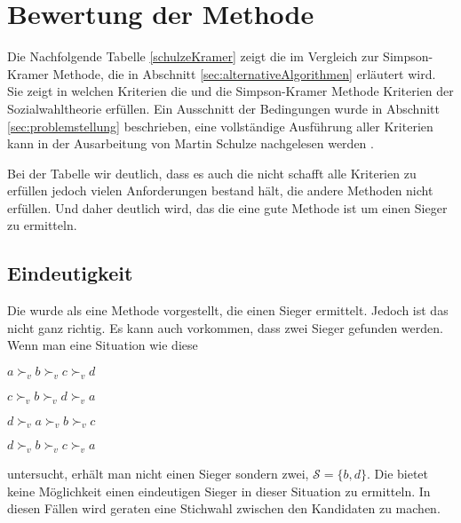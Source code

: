 \section{Bewertung der Methode}
\label{sec:Bewertung1}

Die Nachfolgende Tabelle \ref{schulzeKramer} zeigt die \schulze im Vergleich zur Simpson-Kramer Methode, die in Abschnitt \ref{sec:alternativeAlgorithmen} erläutert wird. Sie zeigt in welchen Kriterien die \schulze und die Simpson-Kramer Methode Kriterien der Sozialwahltheorie erfüllen. Ein Ausschnitt der Bedingungen wurde in Abschnitt \ref{sec:problemstellung} beschrieben, eine vollständige Ausführung aller Kriterien kann in der Ausarbeitung von Martin Schulze nachgelesen werden \citep{Schulze2018}.



Bei der Tabelle wir deutlich, dass es auch die \schulze nicht schafft alle Kriterien zu erfüllen jedoch vielen Anforderungen bestand hält, die andere Methoden nicht erfüllen. Und daher deutlich wird, das die \schulze eine gute \condorcet Methode ist um einen Sieger zu ermitteln.
\newpage

\subsection{Eindeutigkeit}
\label{sec:eindeutigkeit}
Die \schulze wurde als eine Methode vorgestellt, die einen Sieger ermittelt. Jedoch ist das nicht ganz richtig. Es kann auch vorkommen, dass zwei Sieger gefunden werden. Wenn man eine Situation wie diese

\begin{description}
\centering
\item[3 mal] $a \succ_{v} b \succ_{v} c \succ_{v}d$
\item[2 mal] $c \succ_{v} b \succ_{v} d \succ_{v}a$
\item[2 mal] $d \succ_{v} a \succ_{v} b \succ_{v}c$
\item[2 mal] $d \succ_{v} b \succ_{v} c \succ_{v}a$
\end{description} 
untersucht, erhält man nicht einen Sieger sondern zwei, $\mathcal{S}=\{b,d\}$. Die \schulze bietet keine Möglichkeit einen eindeutigen Sieger in dieser Situation zu ermitteln. In diesen Fällen wird geraten eine Stichwahl zwischen den Kandidaten zu machen.
